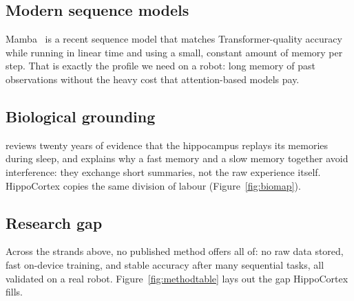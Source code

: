 \documentclass[11pt,a4paper]{article}
\begin{document}
\subsection{Modern sequence models}
Mamba~\citep{gu2023mamba} is a recent sequence model that matches Transformer-quality accuracy while running in linear time and using a small, constant amount of memory per step. That is exactly the profile we need on a robot: long memory of past observations without the heavy cost that attention-based models pay.

\subsection{Biological grounding}
\citet{buzsaki2015hippocampal} reviews twenty years of evidence that the hippocampus replays its memories during sleep, and \citet{mcclelland1995complementary} explains why a fast memory and a slow memory together avoid interference: they exchange short summaries, not the raw experience itself. HippoCortex copies the same division of labour (Figure~\ref{fig:biomap}).

\subsection{Research gap}
Across the strands above, no published method offers all of: no raw data stored, fast on-device training, and stable accuracy after many sequential tasks, all validated on a real robot. Figure~\ref{fig:methodtable} lays out the gap HippoCortex fills.
\end{document}
